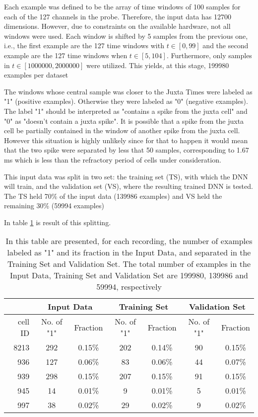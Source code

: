 Each example was defined to be the array of time windows of 100 samples for each of the 127 channels in the probe. Therefore, the input data has 12700 dimensions. However, due to constraints on the available hardware, not all windows were used. Each window is shifted by 5 samples from the previous one, i.e., the first example are the 127 time windows with $t \in [ 0 , 99]$ and the second example are the 127 time windows when $t \in [ 5, 104]$. Furthermore, only samples in $t \in [1000000,2000000]$ were utilized. This yields, at this stage, 199980 examples per dataset

The windows whose central sample was closer to the Juxta Times were labeled as "1" (positive examples). Otherwise they were labeled as "0" (negative examples). The label "1" should be interpreted as "contains a spike from the juxta cell" and "0" as "doesn't contain a juxta spike". It is possible that a spike from the juxta cell be partially contained in the window of another spike from the juxta cell. However this situation is highly unlikely since for that to happen it would mean that the two spike were separated by less that 50 samples, corresponding to 1.67 ms which is less than the refractory period of cells under consideration.

This input data was split in two set: the training set (TS), with which the DNN will train, and the validation set (VS), where the resulting trained DNN is tested. The TS held 70\% of the input data (139986 examples) and VS held the remaining 30\% (59994 examples)

In table \ref{table:summary-beforeUS} is result of this splitting.
\begin{table}[htbp]
\begin{center}
\begin{tabular}{r|cc|cc|cc}
\multicolumn{1}{l|}{} & \multicolumn{ 2}{c|}{Input Data} & \multicolumn{ 2}{c|}{Training Set} & \multicolumn{ 2}{c}{Validation Set} \\ \hline
cell ID & No. of "1"  & Fraction & No. of "1"  & Fraction & No. of "1" & Fraction \\ \hline
8213 & 292 & 0.15\% & 202 & 0.14\% & 90 & 0.15\% \\ 
936 & 127 & 0.06\% & 83 & 0.06\% & 44 & 0.07\% \\ 
939 & 298 & 0.15\% & 207 & 0.15\% & 91 & 0.15\% \\ 
945 & 14 & 0.01\% & 9 & 0.01\% & 5 & 0.01\% \\ 
997 & 38 & 0.02\% & 29 & 0.02\% & 9 & 0.02\% \\ 
\end{tabular}
\end{center}
\caption{In this table are presented, for each recording, the number of examples labeled as "1" and its fraction in the Input Data, and separated in the Training Set and Validation Set. The total number of examples in the Input Data, Training Set and Validation Set are 199980, 139986 and 59994, respectively}
\label{table:summary-beforeUS}
\end{table}

